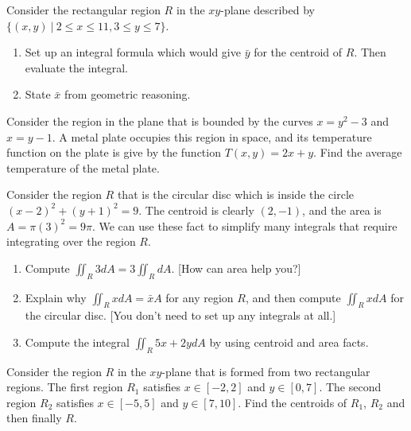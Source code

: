 \begin{problem}
Consider the rectangular region $R$ in the $xy$-plane described by $\{(x,y)\ |\ 2\leq x\leq 11, 3\leq y\leq 7\}$.
\begin{enumerate}
 \item Set up an integral formula which would give $\bar y$ for the centroid of $R$.  Then evaluate the integral.
 \item State $\bar x$ from geometric reasoning.
\end{enumerate}
\end{problem}



\begin{problem}
 Consider the region in the plane that is bounded by the curves $x=y^2-3$ and $x=y-1$.  A metal plate occupies this region in space, and its temperature function on the plate is give by the function $T(x,y)=2x+y$.  Find the average temperature of the metal plate.
\end{problem}

\begin{problem}\label{centroid trick}
Consider the region $R$ that is the circular disc which is inside the circle $(x-2)^2+(y+1)^2=9$. The centroid is clearly $(2,-1)$, and the area is $A=\pi(3)^2=9\pi$.  We can use these fact to simplify many integrals that require integrating over the region $R$.  
\begin{enumerate}
 \item Compute $\iint_R 3dA = 3\iint_RdA$.  [How can area help you?]
 \item Explain why $\iint_R x dA = \bar x A$ for any region $R$, and then compute $\iint_R x dA$ for the circular disc. [You don't need to set up any integrals at all.]
 \item Compute the integral $\iint_R 5x+2y dA$ by using centroid and area facts.
\end{enumerate}
\end{problem}



\begin{problem}
Consider the region $R$ in the $xy$-plane that is formed from two rectangular regions.  The first region $R_1$ satisfies $x\in[-2,2]$ and $y\in[0,7]$.  The second region $R_2$ satisfies $x\in[-5,5]$ and $y\in[7,10]$.  Find the centroids of $R_1$, $R_2$ and then finally $R$.
\end{problem}


